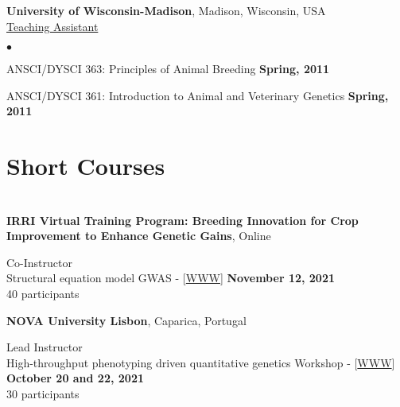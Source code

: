 \documentclass[margin,line,10pt]{res}
\newenvironment{list2}{
  \begin{list}{$\bullet$}{%
      \setlength{\itemsep}{0in}
      \setlength{\parsep}{0in} \setlength{\parskip}{0in}
      \setlength{\topsep}{0in} \setlength{\partopsep}{0in} 
      \setlength{\leftmargin}{0.2in}}}{\end{list}}
\begin{document}
\begin{resume}
 \vspace{1cm}
 
{\bf University of Wisconsin-Madison}, Madison, Wisconsin, USA  \vspace{0.2cm}  \\
\underline{Teaching Assistant} 
 \vspace{0.4cm}
\begin{list2}
\item ANSCI/DYSCI 363: Principles of Animal Breeding    \hfill {\bf Spring, 2011}

\vspace{0.5cm}

\item ANSCI/DYSCI 361: Introduction to Animal and Veterinary Genetics    \hfill {\bf Spring, 2011} 

  \end{list2}



\vspace{0.5cm}
\section{\sc Short Courses}
\vspace{1cm}




\section{}


{\bf IRRI Virtual Training Program: Breeding Innovation for Crop Improvement to Enhance Genetic Gains}, Online
\vspace{.01pt}

Co-Instructor  \\
Structural equation model GWAS - [\textcolor{blue}{\href{}{WWW}}]
\hfill {\bf November 12, 2021} \\
40 participants



{\bf NOVA University Lisbon}, Caparica, Portugal
\vspace{.01pt}

Lead Instructor  \\
High-throughput phenotyping driven quantitative genetics Workshop - [\textcolor{blue}{\href{http://morotalab.org/CMA-FCT-NOVA2021/CMA-FCT-NOVA2021.html}{WWW}}]
\hfill {\bf October 20 and 22, 2021} \\
30 participants




\end{resume}
\end{document}
